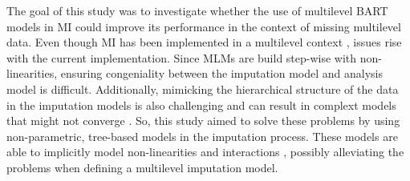 \documentclass[10pt, a4paper, titlepage]{article}
\begin{document}
The goal of this study was to investigate whether the use of multilevel BART models in MI could improve its performance in the context of missing multilevel data. Even though MI has been implemented in a multilevel context \citep{mistlerComparisonJointModel2017, enders2018, enders2018a, enders2020, buurenFlexibleImputationMissing2018, taljaard2008, enders2016, resche-rigon2018, audigier2018, dong2023, grund2016, grund2018a, grund2018, ludtke2017, grund2021, quartagno2022}, issues rise with the current implementation. Since MLMs are build step-wise with non-linearities, ensuring congeniality between the imputation model and analysis model is difficult. Additionally, mimicking the hierarchical structure of the data in the imputation models is also challenging \citep{buurenFlexibleImputationMissing2018, burgette2010, hox2011} and can result in complext models that might not converge \citep{buurenFlexibleImputationMissing2018}. So, this study aimed to solve these problems by using non-parametric, tree-based models in the imputation process. These models are able to implicitly model non-linearities and interactions \citep{hill2020, burgette2010, lin2019, chipman2010, james2021, salditt2023, breiman1984}, possibly alleviating the problems when defining a multilevel imputation model. 
\end{document}
